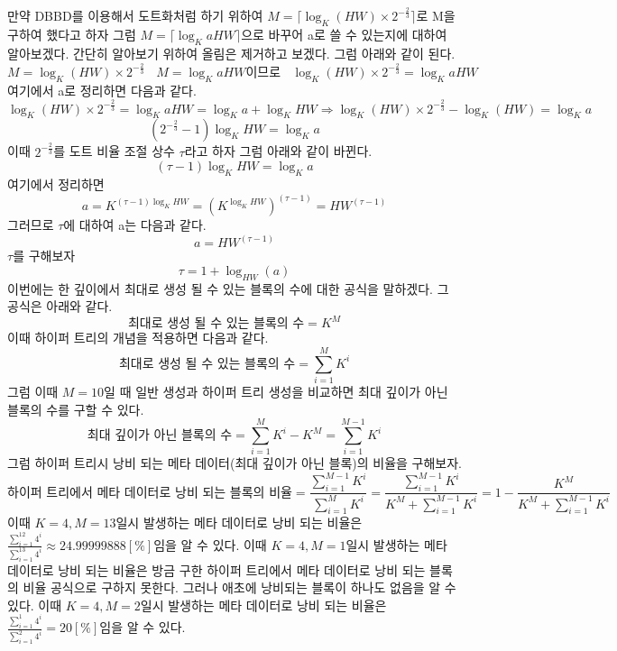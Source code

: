 \documentclass{book}
\begin{document}
\newpage

만약 DBBD를 이용해서 도트화처럼 하기 위하여 $M=\lceil \log_{K}(HW) \times 2^{-\frac{2}{3}} \rceil$로 M을 구하여 했다고 하자 그럼 $M=\lceil \log_{K}aHW \rceil$으로 바꾸어 a로 쓸 수 있는지에 대하여 알아보겠다. 간단히 알아보기 위하여 올림은 제거하고 보겠다. 그럼 아래와 같이 된다.
\[
M= \log_{K}(HW) \times 2^{-\frac{2}{3}}~~~~M=\log_{K}aHW \text{이므로}~~~~ \log_{K}(HW) \times 2^{-\frac{2}{3}}=\log_{K}aHW
\]
여기에서 a로 정리하면 다음과 같다.
\[
\log_{K}(HW) \times 2^{-\frac{2}{3}}=\log_{K}aHW=\log_{K}a+\log_{K}HW \Rightarrow \log_{K}(HW)\times2^{-\frac{2}{3}} - \log_{K}(HW) = \log_{K}a
\]
\[
\left( 2^{-\frac{2}{3}} - 1 \right) \log_{K}HW=\log_{K}a
\]
이때 $2^{-\frac{2}{3}}$를 도트 비율 조절 상수 $\tau$라고 하자 그럼 아래와 같이 바뀐다.
\[
\left( \tau - 1 \right) \log_{K}HW=\log_{K}a
\]
여기에서 정리하면
\[
a=K^{\left( \tau - 1 \right) \log_{K}HW}=\left( K^{\log_{K}HW} \right)^{\left( \tau - 1 \right)}=HW^{(\tau - 1)}
\]
그러므로 $\tau$에 대하여 a는 다음과 같다.
\[
a=HW^{(\tau - 1)}
\]
$\tau$를 구해보자
\[
\tau=1+\log_{HW}(a)
\]
\newline\newline
이번에는 한 깊이에서 최대로 생성 될 수 있는 블록의 수에 대한 공식을 말하겠다. 그 공식은 아래와 같다.
\[
\text{최대로 생성 될 수 있는 블록의 수}=K^M
\]
이때 하이퍼 트리의 개념을 적용하면 다음과 같다.
\[
\text{최대로 생성 될 수 있는 블록의 수}=\sum_{i=1}^M K^i
\]
그럼 이때 $M=10$일 때 일반 생성과 하이퍼 트리 생성을 비교하면 최대 깊이가 아닌 블록의 수를 구할 수 있다.
\[
\text{최대 깊이가 아닌 블록의 수}=\sum_{i=1}^M K^i - K^M = \sum_{i=1}^{M-1} K^i
\]
그럼 하이퍼 트리시 낭비 되는 메타 데이터(최대 깊이가 아닌 블록)의 비율을 구해보자.
\[
\text{하이퍼 트리에서 메타 데이터로 낭비 되는 블록의 비율}=\frac{\sum_{i=1}^{M-1} K^i}{\sum_{i=1}^M K^i}=\frac{\sum_{i=1}^{M-1} K^i}{K^M+\sum_{i=1}^{M-1} K^i}=1 - \frac{K^M}{K^M + \sum_{i=1}^{M-1} K^i}
\]
이때 $K=4, M=13$일시 발생하는 메타 데이터로 낭비 되는 비율은 $\frac{\sum_{i=1}^{12} 4^i}{\sum_{i=1}^{13} 4^i} \approx 24.99999888[\%]$임을 알 수 있다.
\newline\newline
이때 $K=4, M=1$일시 발생하는 메타 데이터로 낭비 되는 비율은 방금 구한 하이퍼 트리에서 메타 데이터로 낭비 되는 블록의 비율 공식으로 구하지 못한다. 그러나 애초에 낭비되는 블록이 하나도 없음을 알 수 있다.
\newline\newline
이때 $K=4, M=2$일시 발생하는 메타 데이터로 낭비 되는 비율은 $\frac{\sum_{i=1}^{1} 4^i}{\sum_{i=1}^{2} 4^i} = 20[\%]$임을 알 수 있다.
\end{document}
